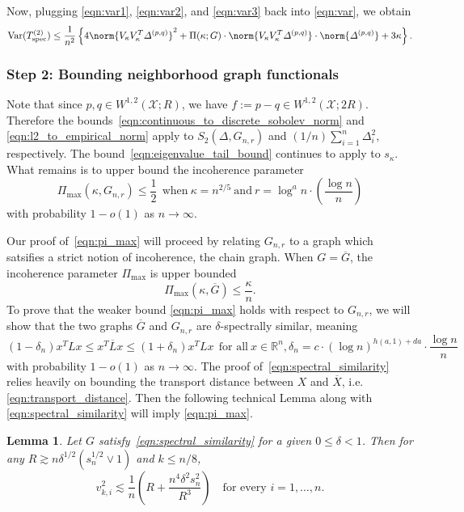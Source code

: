 \documentclass{article}
\newcommand{\Reals}{\mathbb{R}}
\newcommand{\Var}{\mathrm{Var}}
\newcommand{\1}{\mathbf{1}}
\newcommand{\vardeltapq}{\varDelta^{(p,q)}}
\newcommand{\spec}{\mathrm{spec}}
\theoremstyle{alden}
\theoremstyle{aldenthm}
\newtheorem{lemma}{Lemma}
\theoremstyle{definition}
\theoremstyle{remark}
\begin{document}
Now, plugging \eqref{eqn:var1}, \eqref{eqn:var2}, and \eqref{eqn:var3} back into \eqref{eqn:var}, we obtain
\begin{equation}
\label{eqn:var_5}
\Var(T_{\spec}^{(2)}) \leq \frac{1}{n^2}\left\{4\norm{V_{\kappa}V_{\kappa}^T \vardeltapq}^2 + \Pi(\kappa;G) \cdot \norm{V_{\kappa}V_{\kappa}^T \vardeltapq} \cdot \norm{\vardeltapq} + 3\kappa \right\}.
\end{equation}


\subsubsection{Step 2: Bounding neighborhood graph functionals}

Note that since $p,q \in W^{1,2}(\mathcal{X};R)$, we have $f := p - q \in W^{1,2}(\mathcal{X};2R)$. Therefore the bounds~\eqref{eqn:continuous_to_discrete_sobolev_norm} and \eqref{eqn:l2_to_empirical_norm} apply to $S_2(\varDelta,G_{n,r})$ and $(1/n)\sum_{i = 1}^{n}\varDelta_i^2$, respectively. The bound~\eqref{eqn:eigenvalue_tail_bound} continues to apply to $s_{\kappa}$. What remains is to upper bound the incoherence parameter
\begin{equation}
\label{eqn:pi_max}
\Pi_{\max}(\kappa,G_{n,r}) \leq \frac{1}{2}~~\textrm{when}~ \kappa = n^{2/5}~\textrm{and}~ r = \log^a n \cdot \left(\frac{\log n}{n}\right)
\end{equation}
with probability $1 - o(1)$ as $n \to \infty$.

Our proof of~\eqref{eqn:pi_max} will proceed by relating $G_{n,r}$ to a graph which satsifies a strict notion of incoherence, the chain graph. When $G = \overline{G}$, the incoherence parameter $\Pi_{\max}$ is upper bounded
\begin{equation}
\Pi_{\max}(\kappa,\overline{G}) \leq \frac{\kappa}{n}.
\end{equation}
To prove that the weaker bound \eqref{eqn:pi_max} holds with respect to $G_{n,r}$, we will show that the two graphs $\overline{G}$ and $G_{n,r}$ are $\delta$-spectrally similar, meaning
\begin{equation}
\label{eqn:spectral_similarity}
(1 - \delta_n) x^T L x \leq x^T \overline{L} x \leq (1 + \delta_n) x^T L x~~\textrm{for all}~x \in \Reals^n, \delta_n = c \cdot (\log n)^{h(a,1) + da}\cdot \frac{\log n}{n}
\end{equation}
with probability $1 - o(1)$ as $n \to \infty$. The proof of~\eqref{eqn:spectral_similarity} relies heavily on bounding the transport distance between $X$ and $\overline{X}$, i.e. \eqref{eqn:transport_distance}. Then the following technical Lemma along with \eqref{eqn:spectral_similarity} will imply \eqref{eqn:pi_max}.
\begin{lemma}
	\label{lem:pi_max_pf_1}
	Let $G$ satisfy~\eqref{eqn:spectral_similarity} for a given $0 \leq \delta < 1$. Then for any $R \gtrsim n \delta^{1/2} (s_{n}^{1/2} \vee 1)$ and $k \leq n/8$,
	\begin{equation*}
	v_{k,i}^2 \lesssim \frac{1}{n}\left(R + \frac{n^4 \delta^2 s_{n}^2}{R^3}\right) \quad \textrm{for every $i = 1,\ldots,n$.}
	\end{equation*} 
\end{lemma}
\end{document}
